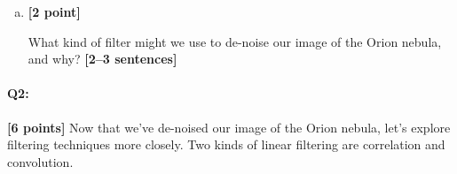 \documentclass[11pt]{article}
\begin{document}
\begin{enumerate}[(a)]

\item \textbf{[2 point]}
\begin{tcolorbox}[colback=orange!5!white,colframe=orange!75!black]
What kind of filter might we use to de-noise our image of the Orion nebula, and why? \textbf{[2--3 sentences]}
\end{tcolorbox}

\pagebreak


\end{enumerate}


\pagebreak
\paragraph{Q2:} \textbf{[6 points]} Now that we've de-noised our image of the Orion nebula, let's explore filtering techniques more closely. Two kinds of linear filtering are correlation and convolution.
\end{document}
